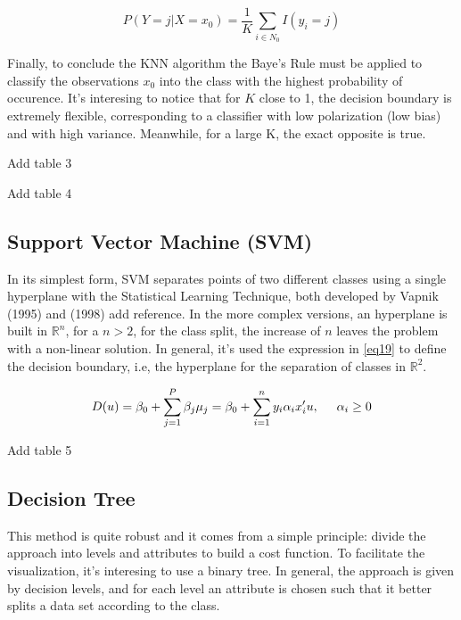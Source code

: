 \documentclass[conference]{IEEEtran}
\newcommand{\reviewUrgent}[1]{{\color{red} #1}} %
\begin{document}
\begin{equation}
    P(Y = j|X = x_0) = \frac{1}{K} \sum_{i \in N_0} I(y_i = j) 
\end{equation}

Finally, to conclude the KNN algorithm the Baye's Rule must be applied to classify the 
observations $x_0$ into the class with the highest probability of occurence. It's 
interesing to notice that for $K$ close to 1, the decision boundary is extremely 
flexible, corresponding to a classifier with low polarization (low bias) and with 
high variance. Meanwhile, for a large K, the exact opposite is true.

\reviewUrgent{Add table 3} 

\reviewUrgent{Add table 4}


\subsection{Support Vector Machine (SVM)}
\label{SVM}
In its simplest form, SVM separates points of two different classes using a single
hyperplane with the Statistical Learning Technique, both developed by Vapnik (1995) and (1998) \reviewUrgent{add reference}.
In the more complex versions, an hyperplane is built in $\mathbb{R}^n$, for a $n>2$, for 
the class split, the increase of $n$ leaves the problem with a non-linear solution. In general,
it's used the expression in \eqref{eq19} to define the decision boundary, i.e, the hyperplane
for the separation of classes in $\mathbb{R}^2$.

\begin{equation}
    D(u)=\beta_0 + \sum_{j=1}^P \beta_j\mu_j = \beta_0+\sum_{i = 1}^ny_i\alpha_ix_i'u, \hspace{0.5cm} \alpha_i \geq 0 \label{eq19}
\end{equation}

\reviewUrgent{Add table 5}

\subsection{Decision Tree}
\label{Decision Tree}
This method is quite robust and it comes from a simple principle: divide the approach
into levels and attributes to build a cost function. To facilitate the visualization,
it's interesing to use a binary tree. In general, the approach is given by decision levels,
and for each level an attribute is chosen such that it better splits a data set 
according to the class.
\end{document}
